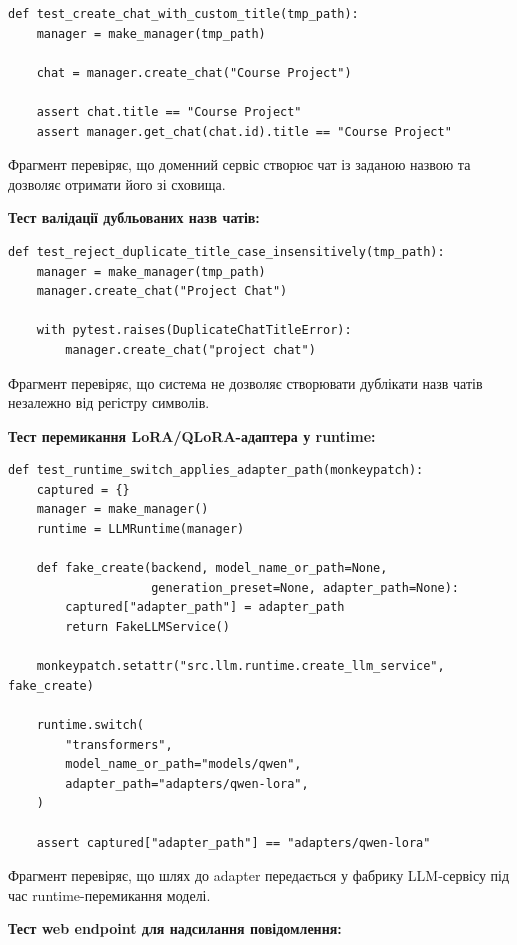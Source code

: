 \begin{lstlisting}[style=plantumlstyle]
def test_create_chat_with_custom_title(tmp_path):
    manager = make_manager(tmp_path)

    chat = manager.create_chat("Course Project")

    assert chat.title == "Course Project"
    assert manager.get_chat(chat.id).title == "Course Project"
\end{lstlisting}

Фрагмент перевіряє, що доменний сервіс створює чат із заданою назвою та дозволяє отримати його зі сховища.

\textbf{Тест валідації дубльованих назв чатів:}

\begin{lstlisting}[style=plantumlstyle]
def test_reject_duplicate_title_case_insensitively(tmp_path):
    manager = make_manager(tmp_path)
    manager.create_chat("Project Chat")

    with pytest.raises(DuplicateChatTitleError):
        manager.create_chat("project chat")
\end{lstlisting}

Фрагмент перевіряє, що система не дозволяє створювати дублікати назв чатів незалежно від регістру символів.

\textbf{Тест перемикання LoRA/QLoRA-адаптера у runtime:}

\begin{lstlisting}[style=plantumlstyle]
def test_runtime_switch_applies_adapter_path(monkeypatch):
    captured = {}
    manager = make_manager()
    runtime = LLMRuntime(manager)

    def fake_create(backend, model_name_or_path=None,
                    generation_preset=None, adapter_path=None):
        captured["adapter_path"] = adapter_path
        return FakeLLMService()

    monkeypatch.setattr("src.llm.runtime.create_llm_service", fake_create)

    runtime.switch(
        "transformers",
        model_name_or_path="models/qwen",
        adapter_path="adapters/qwen-lora",
    )

    assert captured["adapter_path"] == "adapters/qwen-lora"
\end{lstlisting}

Фрагмент перевіряє, що шлях до adapter передається у фабрику LLM-сервісу під час runtime-перемикання моделі.

\textbf{Тест web endpoint для надсилання повідомлення:}

